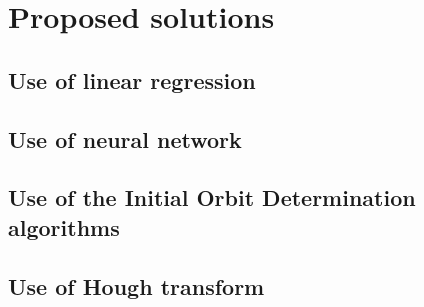 \chapter{Proposed solutions}\label{chap:proposed_solutions}

\section{Use of linear regression}\label{sec:linear_regression}

\section{Use of neural network}\label{sec:neural}

\section{Use of the Initial Orbit Determination algorithms}\label{sec:IDO}

\section{Use of Hough transform}\label{sec:hough}